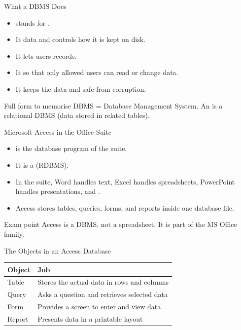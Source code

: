 \documentclass[aspectratio=169]{beamer}
\begin{document}
\begin{frame}{What a DBMS Does}
  \begin{itemize}
    \item {} stands for .
    \item It  data and controls how it is kept on disk.
    \item It lets users  records.
    \item It  so that only allowed users can read or
      change data.
    \item It keeps the data  and safe from corruption.
  \end{itemize}
  \begin{block}{Full form to memorise}
    DBMS = Database Management System. An  is a relational DBMS
    (data stored in related tables).
  \end{block}
\end{frame}

\begin{frame}{Microsoft Access in the Office Suite}
  \begin{itemize}
    \item {} is the database program of the
       suite.
    \item It is a  (RDBMS).
    \item In the suite, Word handles text, Excel handles spreadsheets,
      PowerPoint handles presentations, and .
    \item Access stores tables, queries, forms, and reports inside one
      database file.
  \end{itemize}
  \begin{alertblock}{Exam point}
    Access is a DBMS, not a spreadsheet. It is part of the MS Office
    family.
  \end{alertblock}
\end{frame}

\begin{frame}{The Objects in an Access Database}
  \begin{center}
    \begin{tabular}{p{}p{}}
      \toprule
      \textbf{Object} & \textbf{Job} \\
      \midrule
      Table & Stores the actual data in rows and columns \\
      Query & Asks a question and retrieves selected data \\
      Form & Provides a screen to enter and view data \\
      Report & Presents data in a printable layout \\
      \bottomrule
    \end{tabular}
  \end{center}
  \vspace{0.25cm}
\end{frame}
\end{document}
